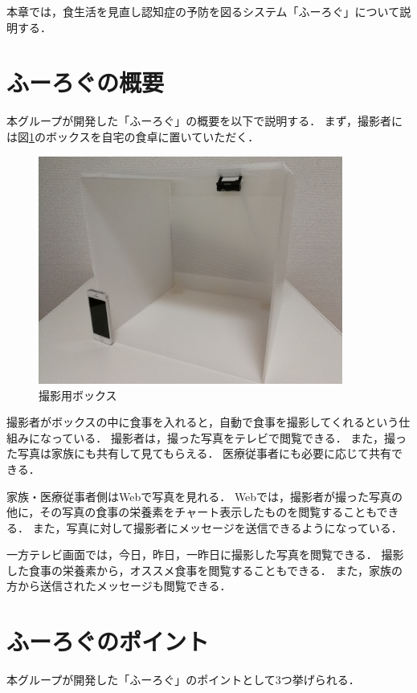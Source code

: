 \documentclass[../report]{subfiles}
\begin{document}
本章では，食生活を見直し認知症の予防を図るシステム「ふーろぐ」について説明する．

\section{ふーろぐの概要}
本グループが開発した「ふーろぐ」の概要を以下で説明する．
まず，撮影者には図\ref{fig:5_box}のボックスを自宅の食卓に置いていただく．

\begin{figure}[htbp]
    \begin{center}
        \includegraphics[width=10cm]{imgs/5_box.jpg}
        \caption{撮影用ボックス}
        \label{fig:5_box}
    \end{center}
\end{figure}

撮影者がボックスの中に食事を入れると，自動で食事を撮影してくれるという仕組みになっている．
撮影者は，撮った写真をテレビで閲覧できる．
また，撮った写真は家族にも共有して見てもらえる．
医療従事者にも必要に応じて共有できる．

家族・医療従事者側はWebで写真を見れる．
Webでは，撮影者が撮った写真の他に，その写真の食事の栄養素をチャート表示したものを閲覧することもできる．
また，写真に対して撮影者にメッセージを送信できるようになっている．

一方テレビ画面では，今日，昨日，一昨日に撮影した写真を閲覧できる．
撮影した食事の栄養素から，オススメ食事を閲覧することもできる．
また，家族の方から送信されたメッセージも閲覧できる．


\section{ふーろぐのポイント}
本グループが開発した「ふーろぐ」のポイントとして3つ挙げられる．
\end{document}
